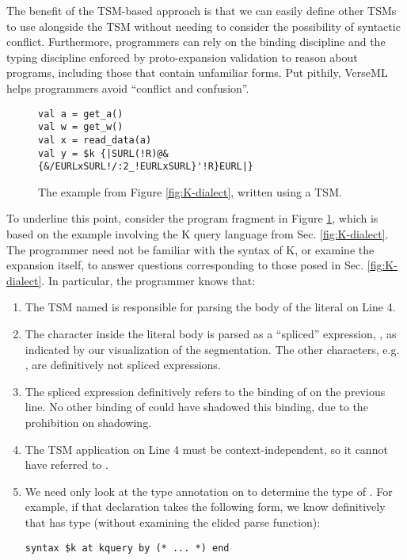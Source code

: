 The benefit of the TSM-based approach is that we can easily define other TSMs to use alongside the  TSM without needing to consider the possibility of syntactic conflict. Furthermore, programmers can rely on the binding discipline and the typing discipline enforced by proto-expansion validation to reason about programs, including those that contain unfamiliar forms. Put pithily, VerseML helps programmers avoid ``conflict and confusion''. 

\begin{figure}
\begin{lstlisting}
val a = get_a()
val w = get_w()
val x = read_data(a)
val y = $k {|SURL(!R)@&{&/EURLxSURL!/:2_!EURLxSURL}'!R}EURL|}
\end{lstlisting}
\caption{The example from Figure \ref{fig:K-dialect}, written using a TSM.}
\label{fig:K-tsms}
\end{figure}

To underline this point, consider the program fragment in Figure \ref{fig:K-tsms}, which is based on the example involving the K query language from Sec. \ref{fig:K-dialect}. The programmer need not be familiar with the syntax of K, or examine the expansion itself, to answer questions corresponding to those posed in Sec. \ref{fig:K-dialect}. In particular, the programmer knows that:
\begin{enumerate}
\item The TSM named  is responsible for parsing the body of the literal on Line 4. 
\item The character  inside the literal body is parsed as a ``spliced'' expression, , as indicated by our visualization of the segmentation. The other characters, e.g. , are definitively not spliced expressions.
\item The spliced expression  definitively refers to the binding of  on the previous line. No other binding of  could have shadowed this binding, due to the prohibition on shadowing.
\item The TSM application on Line 4 must be context-independent, so it cannot have referred to .
\item We need only look at the type annotation on  to determine the type of . For example, if that declaration takes the following form, we know definitively that  has type  (without examining the elided parse function):
\begin{lstlisting}[numbers=none]
syntax $k at kquery by (* ... *) end
\end{lstlisting}
\end{enumerate}

